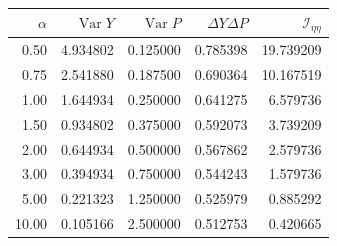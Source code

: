 \begin{center}
\begin{tabular}{rrrrr}
\toprule $\alpha$ & $\operatorname{Var}Y$ & $\operatorname{Var}P$ & $\Delta Y\Delta P$ & $\mathcal I_{\eta\eta}$\\\midrule
0.50 & 4.934802 & 0.125000 & 0.785398 & 19.739209\\
0.75 & 2.541880 & 0.187500 & 0.690364 & 10.167519\\
1.00 & 1.644934 & 0.250000 & 0.641275 & 6.579736\\
1.50 & 0.934802 & 0.375000 & 0.592073 & 3.739209\\
2.00 & 0.644934 & 0.500000 & 0.567862 & 2.579736\\
3.00 & 0.394934 & 0.750000 & 0.544243 & 1.579736\\
5.00 & 0.221323 & 1.250000 & 0.525979 & 0.885292\\
10.00 & 0.105166 & 2.500000 & 0.512753 & 0.420665\\
\bottomrule
\end{tabular}
\end{center}
